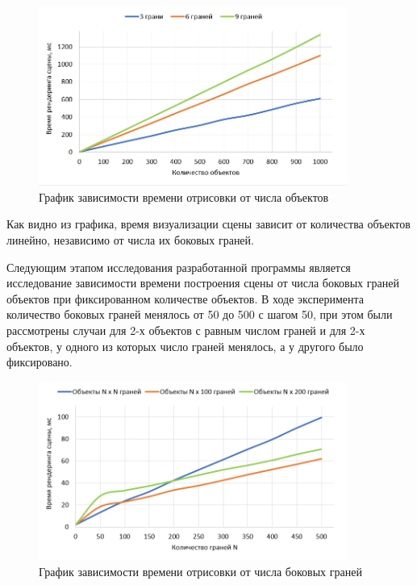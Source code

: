 \begin{figure}[h]
	\centering
	\includegraphics[width=0.9\textwidth]{img/exp/exp1.png}
	\caption{График зависимости времени отрисовки от числа объектов}
	\label{fig:exp-1}
\end{figure}

Как видно из графика, время визуализации сцены зависит от количества объектов линейно, независимо от числа их боковых граней.

Следующим этапом исследования разработанной программы является исследование зависимости времени построения сцены от числа боковых граней объектов при фиксированном количестве объектов. В ходе эксперимента количество боковых граней менялось от 50 до 500 с шагом 50, при этом были рассмотрены случаи для 2-х объектов с равным числом граней и для 2-х объектов, у одного из которых число граней менялось, а у другого было фиксировано. 

\begin{figure}[h]
	\centering
	\includegraphics[width=0.9\textwidth]{img/exp/exp2.png}
	\caption{График зависимости времени отрисовки от числа боковых граней}
	\label{fig:exp-2}
\end{figure}

